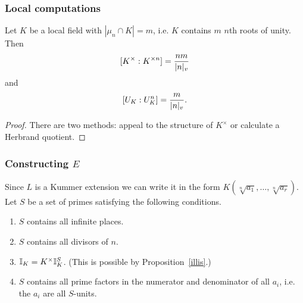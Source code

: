 \subsubsection{Local computations}
\begin{pr}
Let $K$ be a local field with $|\mu_{n}\cap K|=m$, i.e. $K$ contains $m$ $n$th roots of unity.
Then
\[
[K^{\times}:K^{\times n}]=\frac{nm}{|n|_v}
\]
and
\[
[U_K:U_K^{n}]=\frac{m}{|n|_v}.
\]
\end{pr}
\begin{proof}
There are two methods: appeal to the structure of $K^{\times}$ or calculate a Herbrand quotient.
%
\end{proof}
\subsubsection{Constructing $E$}
Since $L$ is a Kummer extension we can write it in the form $K(\sqrt[n]{a_1},\ldots, \sqrt[n]{a_r})$. 
Let $S$ be a set of primes satisfying the following conditions.
\begin{enumerate}
\item
$S$ contains all infinite places.
\item
$S$ contains all divisors of $n$.
\item
$\mathbb{I}_K=K^{\times}\mathbb{I}_K^S$. (This is possible by Proposition~\ref{illis}.)
\item
$S$ contains all prime factors in the numerator and denominator of all $a_i$, i.e. the $a_i$ are all $S$-units.
\end{enumerate}

